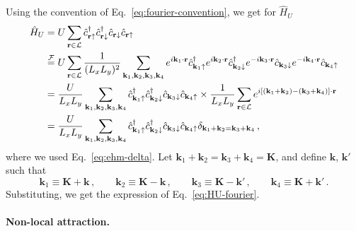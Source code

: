 \begin{tabproof}
	
	Using the convention of Eq.~\eqref{eq:fourier-convention}, we get for $\hat H_U$
	\[
	\begin{aligned}
		\hat H_U &= U \sum_{\mathbf{r}\in\mathcal{L}} \hat c_{\mathbf{r}\uparrow}^\dagger \hat c_{\mathbf{r}\downarrow}^\dagger \hat c_{\mathbf{r}\downarrow} \hat c_{\mathbf{r}\uparrow} \\
		&\stackrel{\mathcal{F}}{=} U \sum_{\mathbf{r}\in\mathcal{L}} \frac{1}{(L_x L_y)^2} \sum_{\mathbf{k}_1,\mathbf{k}_2,\mathbf{k}_3,\mathbf{k}_4} e^{i \mathbf{k}_1 \cdot \mathbf{r}} \hat c_{\mathbf{k}_1 \uparrow}^\dagger e^{i \mathbf{k}_2 \cdot \mathbf{r}} \hat c_{\mathbf{k}_2 \downarrow}^\dagger e^{-i \mathbf{k}_3 \cdot \mathbf{r}} \hat c_{\mathbf{k}_3 \downarrow} e^{-i \mathbf{k}_4 \cdot \mathbf{r}} \hat c_{\mathbf{k}_4 \uparrow} \\
		&= \frac{U}{L_x L_y} \sum_{\mathbf{k}_1,\mathbf{k}_2,\mathbf{k}_3,\mathbf{k}_4} \hat c_{\mathbf{k}_1 \uparrow}^\dagger \hat c_{\mathbf{k}_2 \downarrow}^\dagger \hat c_{\mathbf{k}_3 \downarrow} \hat c_{\mathbf{k}_4 \uparrow} \times \frac{1}{L_x L_y} \sum_{\mathbf{r}\in\mathcal{L}} e^{i \left[ (\mathbf{k}_1 + \mathbf{k}_2) - (\mathbf{k}_3 + \mathbf{k}_4) \right] \cdot \mathbf{r}} \\
		&= \frac{U}{L_x L_y} \sum_{\mathbf{k}_1,\mathbf{k}_2,\mathbf{k}_3,\mathbf{k}_4} \hat c_{\mathbf{k}_1 \uparrow}^\dagger \hat c_{\mathbf{k}_2 \downarrow}^\dagger \hat c_{\mathbf{k}_3 \downarrow} \hat c_{\mathbf{k}_4 \uparrow} \delta_{\mathbf{k}_1+\mathbf{k}_2 = \mathbf{k}_3+\mathbf{k}_4} \, ,
	\end{aligned}
	\]
	where we used Eq.~\eqref{eq:ehm-delta}. Let $\mathbf{k}_1 + \mathbf{k}_2 = \mathbf{k}_3 + \mathbf{k}_4 = \mathbf{K}$, and define $\mathbf{k}$, $\mathbf{k}'$ such that
	\begin{equation}\label{eq:k-k'-K}
		\mathbf{k}_1 \equiv \mathbf{K} + \mathbf{k} \, ,
		\qquad
		\mathbf{k}_2 \equiv \mathbf{K} - \mathbf{k} \, ,
		\qquad
		\mathbf{k}_3 \equiv \mathbf{K} - \mathbf{k}' \, ,
		\qquad
		\mathbf{k}_4 \equiv \mathbf{K} + \mathbf{k}' \, .
	\end{equation}
	Substituting, we get the expression of Eq.~\eqref{eq:HU-fourier}.

\end{tabproof}

\paragraph{Non-local attraction.}

